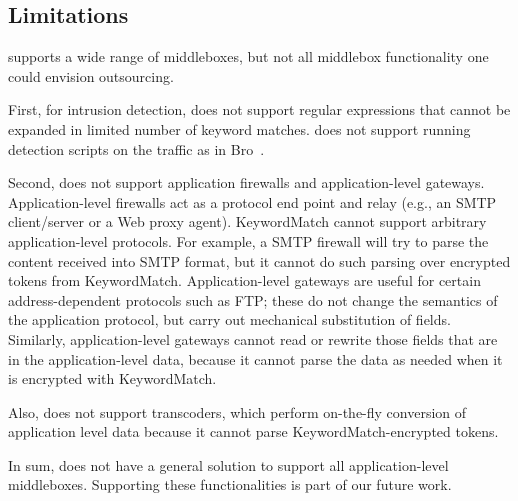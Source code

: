 \subsection{Limitations}\label{s:limitations}

\sys supports a wide range of middleboxes, but not all middlebox functionality one could envision outsourcing.

First, for intrusion detection, \sys does not support regular expressions that cannot be expanded in limited number of keyword matches. \sys does not support running detection scripts on the traffic as in Bro~\cite{Bro}.

Second, \sys does not support application firewalls and application-level gateways.
Application-level firewalls act as a protocol end point and relay (e.g., an SMTP client/server or a Web proxy agent).
KeywordMatch cannot support arbitrary application-level protocols. For example, a SMTP firewall will try to parse the content received into SMTP format, but it cannot do such parsing over encrypted tokens from KeywordMatch. Application-level gateways are useful for certain address-dependent 
protocols such as FTP; these do not change the semantics of the application protocol, but carry 
out mechanical substitution of fields. Similarly, application-level gateways cannot read or 
rewrite those fields that are in the application-level data, because it cannot parse the data as needed when it is encrypted with KeywordMatch.


Also, \sys does not support transcoders, which perform on-the-fly conversion of application level 
data because it cannot parse KeywordMatch-encrypted tokens.

In sum, \sys does not have a general solution to support all application-level middleboxes.
Supporting these functionalities is part of our future work.

